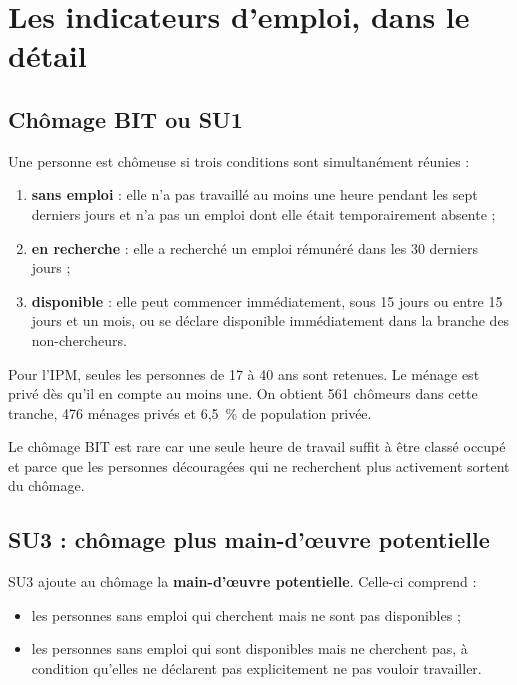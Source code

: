 \documentclass[11pt,a4paper]{article}
\begin{document}
\section{Les indicateurs d'emploi, dans le détail}

\subsection{Chômage BIT ou SU1}

Une personne est chômeuse si trois conditions sont simultanément réunies :

\begin{enumerate}
  \item \textbf{sans emploi} : elle n'a pas travaillé au moins une heure pendant les sept
  derniers jours et n'a pas un emploi dont elle était temporairement absente ;
  \item \textbf{en recherche} : elle a recherché un emploi rémunéré dans les 30 derniers jours ;
  \item \textbf{disponible} : elle peut commencer immédiatement, sous 15 jours ou entre 15 jours
  et un mois, ou se déclare disponible immédiatement dans la branche des non-chercheurs.
\end{enumerate}

Pour l'IPM, seules les personnes de 17 à 40 ans sont retenues. Le ménage est privé dès qu'il en
compte au moins une. On obtient 561 chômeurs dans cette tranche, 476 ménages privés et 6,5~\% de
population privée.

Le chômage BIT est rare car une seule heure de travail suffit à être classé occupé et parce que
les personnes découragées qui ne recherchent plus activement sortent du chômage.

\subsection{SU3 : chômage plus main-d'œuvre potentielle}

SU3 ajoute au chômage la \textbf{main-d'œuvre potentielle}. Celle-ci comprend :

\begin{itemize}
  \item les personnes sans emploi qui cherchent mais ne sont pas disponibles ;
  \item les personnes sans emploi qui sont disponibles mais ne cherchent pas, à condition
  qu'elles ne déclarent pas explicitement ne pas vouloir travailler.
\end{itemize}
\end{document}
